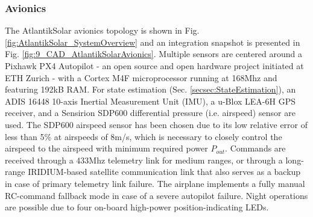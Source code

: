 \subsubsection{Avionics}
The AtlantikSolar avionics topology is shown in Fig. \ref{fig:AtlantikSolar_SystemOverview} and an integration snapshot is presented in Fig. \ref{fig:9_CAD_AtlantikSolarAvionics}. Multiple sensors are centered around a Pixhawk PX4 Autopilot - an open source and open hardware project initiated at ETH Zurich - with a Cortex M4F microprocessor running at 168Mhz and featuring 192kB RAM. For state estimation (Sec. \ref{secsec:StateEstimation}), an ADIS 16448 10-axis Inertial Measurement Unit (IMU), a u-Blox LEA-6H GPS receiver, and a Sensirion SDP600 differential pressure (i.e. airspeed) sensor are used. The SDP600 airspeed sensor has been chosen due to its low relative error of less than 5\% at airspeeds of 8m/s, which is necessary to closely control the airspeed to the airspeed with minimum required power $P_{out}$. Commands are received through a 433Mhz telemetry link for medium ranges, or through a long-range IRIDIUM-based satellite communication link that also serves as a backup in case of primary telemetry link failure. The airplane implements a fully manual RC-command fallback mode in case of a severe autopilot failure. Night operations are possible due to four on-board high-power position-indicating LEDs.

